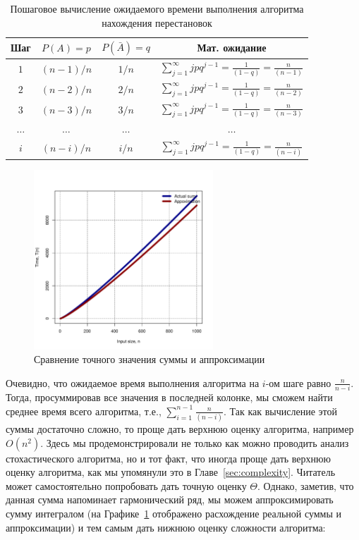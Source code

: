 \begin{table}
\centering
\begin{tabular}{|c|c|c|c|}
\hline
Шаг & $P(A) = p$ & $P(\bar{A}) = q$ & Мат. ожидание  \\\hline
$1$ &  $(n-1)/n$      & $1/n$           & $\sum_{j=1}^{\infty} jpq^{j-1} = \frac{1}{(1-q)} = \frac{n}{(n-1)} $ \\\hline
$2$ &  $(n-2)/n$      & $2/n$           & $\sum_{j=1}^{\infty} jpq^{j-1} = \frac{1}{(1-q)} = \frac{n}{(n-2)} $ \\\hline
$3$ &  $(n-3)/n$      & $3/n$           & $\sum_{j=1}^{\infty} jpq^{j-1} = \frac{1}{(1-q)} = \frac{n}{(n-3)} $ \\\hline
$\ldots$ & $\ldots$   & $\ldots$        & $\ldots$ \\\hline
$i$ &  $(n-i)/n$      & $i/n$           & $\sum_{j=1}^{\infty} jpq^{j-1} = \frac{1}{(1-q)} = \frac{n}{(n-i)} $ \\\hline
\end{tabular}
\caption{Пошаговое вычисление ожидаемого времени выполнения алгоритма нахождения перестановок}
\label{tab:permutations}
\end{table}

\begin{figure}[ht!]
\centering
\includegraphics[width=0.6\textwidth]{graphics/approximation.pdf}
\caption{Сравнение точного значения суммы и аппроксимации}
\label{fig:approximation}
\end{figure}


Очевидно, что ожидаемое время выполнения алгоритма на $i$-ом шаге равно $\frac{n}{n-i}$.
Тогда, просуммировав все значения в последней колонке, мы сможем найти среднее время всего алгоритма, 
т.е., $\sum_{i=1}^{n-1}\frac{n}{(n-i)}$. Так как вычисление этой суммы достаточно сложно, то 
проще дать верхнюю оценку алгоритма, например $O(n^2)$. Здесь мы продемонстрировали не только как можно 
проводить анализ стохастического алгоритма, но и тот факт, что иногда проще дать верхнюю оценку
алгоритма, как мы упомянули это в Главе~\ref{sec:complexity}. Читатель может самостоятельно
попробовать дать точную оценку $\Theta$. Однако, заметив, что данная сумма напоминает 
гармонический ряд, мы можем аппроксимировать сумму интегралом 
(на Графике~\ref{fig:approximation} отображено расхождение реальной суммы и аппроксимации)
и тем самым дать нижнюю оценку сложности алгоритма:

